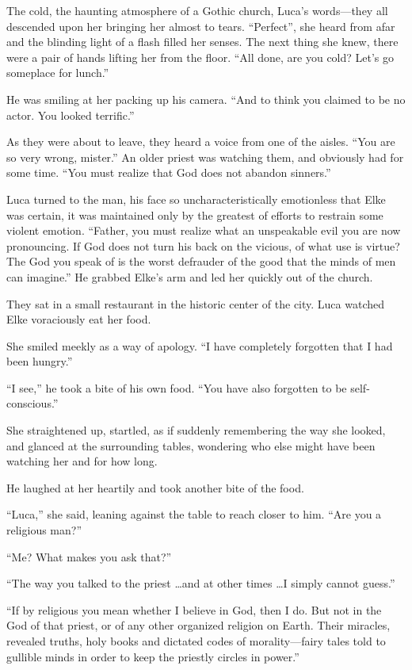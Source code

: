 The cold, the haunting atmosphere of a Gothic church, Luca's words---they all descended upon her bringing her almost to tears. ``Perfect'', she heard from afar and the blinding light of a flash filled her senses. The next thing she knew, there were a pair of hands lifting her from the floor. ``All done, are you cold? Let's go someplace for lunch.''

He was smiling at her packing up his camera. ``And to think you claimed to be no actor. You looked terrific.''

As they were about to leave, they heard a voice from one of the aisles. ``You are so very wrong, mister.'' An older priest was watching them, and obviously had for some time. ``You must realize that God does not abandon sinners.''

Luca turned to the man, his face so uncharacteristically emotionless that Elke was certain, it was maintained only by the greatest of efforts to restrain some violent emotion. ``Father, you must realize what an unspeakable evil you are now pronouncing. If God does not turn his back on the vicious, of what use is virtue? The God you speak of is the worst defrauder of the good that the minds of men can imagine.'' He grabbed Elke's arm and led her quickly out of the church.

\sectionline

They sat in a small restaurant in the historic center of the city. Luca watched Elke voraciously eat her food.

She smiled meekly as a way of apology. ``I have completely forgotten that I had been hungry.''

``I see,'' he took a bite of his own food. ``You have also forgotten to be self-conscious.''

She straightened up, startled, as if suddenly remembering the way she looked, and glanced at the surrounding tables, wondering who else might have been watching her and for how long.

He laughed at her heartily and took another bite of the food.

``Luca,'' she said, leaning against the table to reach closer to him. ``Are you a religious man?''

``Me? What makes you ask that?''

``The way you talked to the priest \ldots and at other times \ldots I simply cannot guess.''

``If by religious you mean whether I believe in God, then I do. But not in the God of that priest, or of any other organized religion on Earth. Their miracles, revealed truths, holy books and dictated codes of morality---fairy tales told to gullible minds in order to keep the priestly circles in power.''

